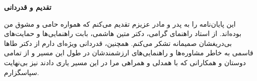 \thispagestyle{empty}

\vspace*{1cm}

\centerline{\Large\textbf{تقدیم و قدردانی}}
\vskip 1.8cm

{
این پایان‌نامه را به پدر و مادر عزیزم تقدیم می‌کنم که همواره حامی و مشوق من بوده‌اند. از استاد راهنمای گرامی، دکتر متین هاشمی، بابت راهنمایی‌ها و حمایت‌های بی‌دریغشان صمیمانه تشکر می‌کنم. همچنین، قدردانی ویژه‌ای دارم از دکتر طاها قاسمی به خاطر مشاوره‌ها و راهنمایی‌های ارزشمندشان در طول این مسیر و از تمامی دوستان و همکارانی که با همدلی و همراهی مرا در این مسیر یاری دادند نیز بی‌نهایت سپاسگزارم.
}




